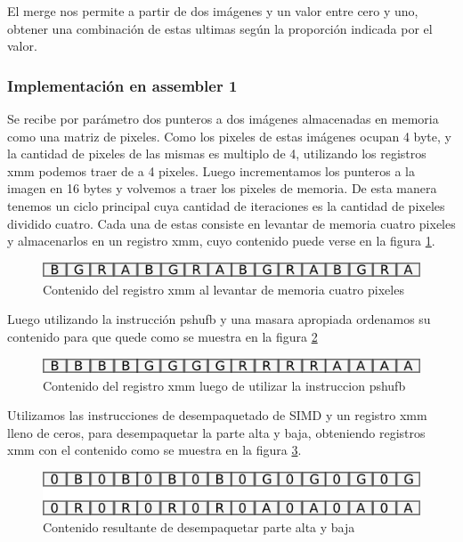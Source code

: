 \documentclass[a4paper]{article}
\begin{document}
El merge nos permite a partir de dos imágenes y un valor entre cero y uno, obtener una combinación de estas ultimas según la proporción indicada por el valor.

\subsubsection{Implementación en assembler 1}

Se recibe por parámetro dos punteros a dos imágenes almacenadas en memoria como una matriz de pixeles. Como los pixeles de estas imágenes ocupan 4 byte, y la cantidad de pixeles de las mismas es multiplo de 4,  utilizando los registros xmm podemos traer de a 4 pixeles. Luego incrementamos los punteros a la imagen en 16 bytes y volvemos a traer los pixeles de memoria. De esta manera tenemos un ciclo principal cuya cantidad de iteraciones es la cantidad de pixeles dividido cuatro. Cada una de estas consiste en levantar de memoria cuatro pixeles y almacenarlos en un registro xmm, cuyo contenido puede verse en la figura \ref{primerXmm}.

\begin{figure}[H]
\centering
\includegraphics[scale=0.8]{imagenes/primerXmm.png}
\caption{Contenido del registro xmm al levantar de memoria cuatro pixeles}
\label{primerXmm}
\end{figure}

Luego utilizando la instrucción pshufb y una masara apropiada ordenamos su contenido para que quede como se muestra en la figura \ref{segundoXmm}

\begin{figure}[H]
\centering
\includegraphics[scale=0.8]{imagenes/segundoXmm.png}
\caption{Contenido del registro xmm luego de utilizar la instruccion pshufb}
\label{segundoXmm}
\end{figure}

Utilizamos las instrucciones de desempaquetado de SIMD y un registro xmm lleno de ceros, para desempaquetar la parte alta y baja, obteniendo registros xmm con el contenido como se muestra en la figura \ref{tercerXmm}.


\begin{figure}[H]
\centering
\includegraphics[scale=0.8]{imagenes/tecerXmm.png}
\caption{Contenido resultante de desempaquetar parte alta y baja}
\label{tercerXmm}
\end{figure}
\end{document}
